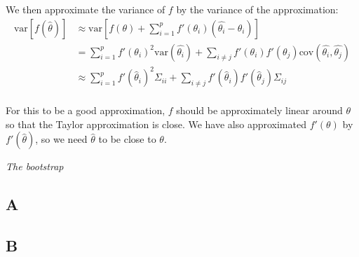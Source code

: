 \documentclass{article}
\begin{document}
We then approximate the variance of \(f\) by the variance of the approximation:
\begin{align*}
\mbox{var}[f(\hat{\theta})] &\approx \mbox{var}[ f(\theta) + \sum_{i=1}^p f'(\theta_i) (\hat{\theta_i} - \theta_i)]\\
&= \sum_{i=1}^p f'(\theta_i)^2 \mbox{var}(\hat{\theta_i}) + \sum_{i\neq j} f'(\theta_i) f'(\theta_j) \mbox{cov}(\hat{\theta_i}, \hat{\theta_j})\\
&\approx \sum_{i=1}^p f'(\hat{\theta}_i)^2 \Sigma_{ii} + \sum_{i\neq j} f'(\hat{\theta}_i) f'(\hat{\theta}_j) \Sigma_{ij}\\
\end{align*}

For this to be a good approximation, \(f\) should be approximately linear around \(\theta\) so that the Taylor approximation is close. We have also approximated \(f'(\theta)\) by \(f'(\hat{\theta})\), so we need \(\hat{\theta}\) to be close to \(\theta\).

\textit{The bootstrap}
\subsection*{A}

\subsection*{B}
\end{document}
